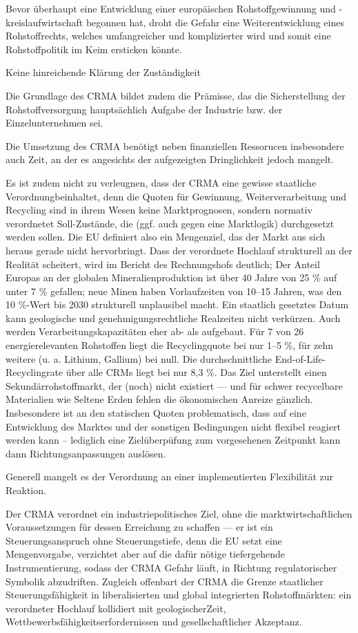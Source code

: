 \documentclass[12pt,a4paper,oneside]{book} %
\begin{document}
Bevor überhaupt eine Entwicklung einer europäischen Rohstoffgewinnung und -kreislaufwirtschaft begonnen hat, droht die Gefahr eine Weiterentwicklung eines Rohstoffrechts, welches umfangreicher und komplizierter wird und somit eine Rohstoffpolitik im Keim ersticken könnte.

Keine hinreichende Klärung der Zuständigkeit

Die Grundlage des CRMA bildet zudem die Prämisse, das die Sicherstellung der Rohstoffversorgung hauptsächlich Aufgabe der Industrie bzw. der Einzelunternehmen sei.

Die Umsetzung des CRMA benötigt neben finanziellen Ressorucen insbesondere auch Zeit, an der es angesichts der aufgezeigten Dringlichkeit jedoch mangelt.

Es ist zudem nicht zu verleugnen, dass der CRMA eine gewisse \glqq staatliche Verordnung\grqq beinhaltet,\autocite{Frenz 2025, S. 316.} denn die Quoten für Gewinnung, Weiterverarbeitung und Recycling sind in ihrem Wesen keine Marktprognosen, sondern normativ verordnetet Soll-Zustände, die (ggf. auch gegen eine Marktlogik) durchgesetzt werden sollen. Die EU definiert also ein Mengenziel, das der Markt aus sich heraus gerade nicht hervorbringt. Dass der verordnete Hochlauf strukturell an der Realität scheitert, wird im Bericht des Rechnungshofs deutlich; Der Anteil Europas an der globalen Mineralienproduktion ist über 40 Jahre von 25 \% auf unter 7 \% gefallen; neue Minen haben Vorlaufzeiten von 10–15 Jahren, was den 10 \%-Wert bis 2030 strukturell unplausibel macht. Ein staatlich gesetztes Datum kann geologische und genehmigungsrechtliche Realzeiten nicht verkürzen. Auch werden Verarbeitungskapazitäten eher ab- als aufgebaut. Für 7 von 26 energierelevanten Rohstoffen liegt die Recyclingquote bei nur 1–5 \%, für zehn weitere (u. a. Lithium, Gallium) bei null. Die durchschnittliche End-of-Life-Recyclingrate über alle CRMs liegt bei nur 8,3 \%. Das Ziel unterstellt einen Sekundärrohstoffmarkt, der (noch) nicht existiert — und für schwer recycelbare Materialien wie Seltene Erden fehlen die ökonomischen Anreize gänzlich. Insbesondere ist an den statischen Quoten problematisch, dass auf eine Entwicklung des Marktes und der sonstigen Bedingungen nicht flexibel reagiert werden kann -- lediglich eine Zielüberpüfung zum vorgesehenen Zeitpunkt kann dann Richtungsanpassungen auslösen.

Generell mangelt es der Verordnung an einer implementierten Flexibilität zur Reaktion.

Der CRMA verordnet ein industriepolitisches Ziel, ohne die marktwirtschaftlichen Voraussetzungen für dessen Erreichung zu schaffen — er ist ein Steuerungsanspruch ohne Steuerungstiefe, denn die EU setzt eine Mengenvorgabe, verzichtet aber auf die dafür nötige tiefergehende Instrumentierung, sodass der CRMA Gefahr läuft, in Richtung regulatorischer Symbolik abzudriften. Zugleich offenbart der CRMA die Grenze staatlicher Steuerungsfähigkeit in liberalisierten und global integrierten Rohstoffmärkten: ein verordneter Hochlauf kollidiert mit \glqq geologischer\grqq Zeit, Wettbewerbsfähigkeitserfordernissen und gesellschaftlicher Akzeptanz.
\end{document}
